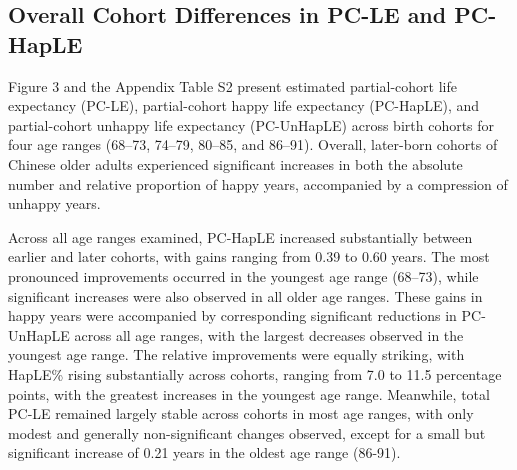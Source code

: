 \documentclass[12pt, a4paper]{article}
\begin{document}
\subsection{Overall Cohort Differences in PC-LE and PC-HapLE}

Figure 3 and the Appendix Table S2 present estimated partial-cohort life expectancy (PC-LE), partial-cohort happy life expectancy (PC-HapLE), and partial-cohort unhappy life expectancy (PC-UnHapLE) across birth cohorts for four age ranges (68–73, 74–79, 80–85, and 86–91). Overall, later-born cohorts of Chinese older adults experienced significant increases in both the absolute number and relative proportion of happy years, accompanied by a compression of unhappy years.

Across all age ranges examined, PC-HapLE increased substantially between earlier and later cohorts, with gains ranging from 0.39 to 0.60 years. The most pronounced improvements occurred in the youngest age range (68–73), while significant increases were also observed in all older age ranges. These gains in happy years were accompanied by corresponding significant reductions in PC-UnHapLE across all age ranges, with the largest decreases observed in the youngest age range. The relative improvements were equally striking, with HapLE\% rising substantially across cohorts, ranging from 7.0 to 11.5 percentage points, with the greatest increases in the youngest age range. Meanwhile, total PC-LE remained largely stable across cohorts in most age ranges, with only modest and generally non-significant changes observed, except for a small but significant increase of 0.21 years in the oldest age range (86-91).
\end{document}
